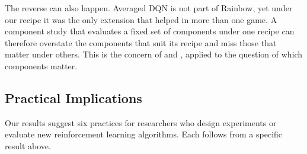 \documentclass[conference,a4paper]{IEEEtran}
\begin{document}
The reverse can also happen. Averaged DQN is not part of Rainbow, yet under our recipe it was the only extension that
helped in more than one game. A component study that evaluates a fixed set of components under one recipe can
therefore overstate the components that suit its recipe and miss those that matter under others. This is the concern
of \citet{henderson2018deep} and \citet{jordan2020evaluating}, applied to the question of which components matter.

\subsection{Practical Implications}\label{sec:implications}
Our results suggest six practices for researchers who design experiments or evaluate new reinforcement learning
algorithms. Each follows from a specific result above.
\end{document}
